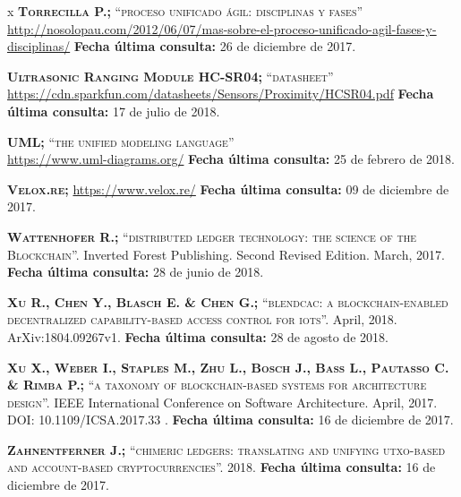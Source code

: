 \begin{thebibliography} {x}
	 \textsc{\textbf{Torrecilla P.; }}\textsc{“proceso unificado ágil: disciplinas y fases”} \\ 
	\url{http://nosolopau.com/2012/06/07/mas-sobre-el-proceso-unificado-agil-fases-y-disciplinas/}
	\newline \textbf{Fecha última consulta:} 26 de diciembre de 2017.
		
	 \textsc{\textbf{Ultrasonic Ranging Module HC-SR04; }}\textsc{“datasheet”} \\
	\url{https://cdn.sparkfun.com/datasheets/Sensors/Proximity/HCSR04.pdf}
	\newline \textbf{Fecha última consulta:} 17 de julio de 2018.
				
	 \textsc{\textbf{UML; }}\textsc{“the unified modeling language”} \\ 
	\url{https://www.uml-diagrams.org/}
	\newline \textbf{Fecha última consulta:} 25 de febrero de 2018.	
		
	 \textsc{\textbf{Velox.re; }} 
	\url{https://www.velox.re/}
	\newline \textbf{Fecha última consulta:} 09 de diciembre de 2017.
	
	 \textsc{\textbf{Wattenhofer R.; }}\textsc{“distributed ledger technology: the science of the Blockchain”.} Inverted Forest Publishing. Second Revised Edition. March, 2017.
	\newline \textbf{Fecha última consulta:} 28 de junio de 2018.
	
	 \textsc{\textbf{Xu R., Chen Y., Blasch E. \& Chen G.; }} \textsc{“blendcac: a blockchain-enabled decentralized capability-based access control for iots”.} April, 2018. ArXiv:1804.09267v1.
	\newline \textbf{Fecha última consulta:} 28 de agosto de 2018.
			
	 \textsc{\textbf{Xu X., Weber I., Staples M., Zhu L., Bosch J., Bass L., Pautasso C. \& Rimba P.; }} \textsc{“a taxonomy of blockchain-based systems for architecture design”.} IEEE International Conference on Software Architecture. April, 2017. DOI: 10.1109/ICSA.2017.33 .
	\newline \textbf{Fecha última consulta:} 16 de diciembre de 2017.
	
	 \textsc{\textbf{Zahnentferner J.; }} \textsc{“chimeric ledgers: translating and unifying utxo-based and account-based cryptocurrencies”.} 2018.
	\newline \textbf{Fecha última consulta:} 16 de diciembre de 2017.
	

\end{thebibliography}
